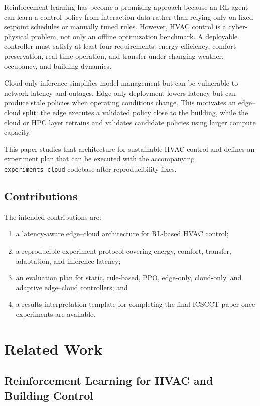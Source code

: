 \documentclass[11pt,a4paper]{article}
\begin{document}
Reinforcement learning has become a promising approach because an RL agent can learn a control policy from interaction data rather than relying only on fixed setpoint schedules or manually tuned rules. However, HVAC control is a cyber-physical problem, not only an offline optimization benchmark. A deployable controller must satisfy at least four requirements: energy efficiency, comfort preservation, real-time operation, and transfer under changing weather, occupancy, and building dynamics.

Cloud-only inference simplifies model management but can be vulnerable to network latency and outages. Edge-only deployment lowers latency but can produce stale policies when operating conditions change. This motivates an edge--cloud split: the edge executes a validated policy close to the building, while the cloud or HPC layer retrains and validates candidate policies using larger compute capacity.

This paper studies that architecture for sustainable HVAC control and defines an experiment plan that can be executed with the accompanying \texttt{experiments\_cloud} codebase after reproducibility fixes.

\subsection{Contributions}

The intended contributions are:
\begin{enumerate}
  \item a latency-aware edge--cloud architecture for RL-based HVAC control;
  \item a reproducible experiment protocol covering energy, comfort, transfer, adaptation, and inference latency;
  \item an evaluation plan for static, rule-based, PPO, edge-only, cloud-only, and adaptive edge--cloud controllers; and
  \item a results-interpretation template for completing the final ICSCCT paper once experiments are available.
\end{enumerate}

\section{Related Work}

\subsection{Reinforcement Learning for HVAC and Building Control}
\end{document}
